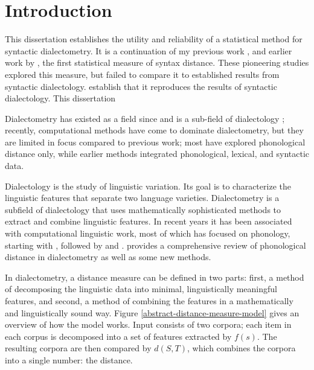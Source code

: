 \chapter{Introduction}

This dissertation establishes the utility and reliability of a
statistical method for syntactic dialectometry. It is a continuation of my previous
work \cite{sanders07}, \cite{sanders08b} and earlier work by
, the first statistical measure of syntax
distance. These pioneering studies explored this measure, but failed
to compare it to established results from syntactic dialectology. establish that it reproduces the results of syntactic dialectology. This
dissertation 

Dialectometry has existed as a field since
 and is a sub-field of dialectology
\cite{chambers98}; recently, computational methods have come to
dominate dialectometry, but they are limited in focus compared to
previous work; most have explored phonological distance only, while
earlier methods integrated phonological, lexical, and syntactic data.

Dialectology is the study of linguistic variation. %
Its goal is to characterize the linguistic features that
separate two language varieties. Dialectometry is a subfield of
dialectology that uses mathematically sophisticated methods to extract
and combine linguistic features. In recent years it has
been associated with computational linguistic work, most of which
has focused on phonology, starting with
, followed by  and
.  provides a comprehensive
review of phonological distance in dialectometry as well as some new
methods.

In dialectometry, a distance measure can be defined in two parts:
first, a method of decomposing the linguistic data into minimal,
linguistically meaningful features, and second, a method of combining
the features in a mathematically and linguistically sound way. Figure
\ref{abstract-distance-measure-model} gives an overview of how the
model works. Input consists of two corpora; each item in each corpus
is decomposed into a set of features extracted by $f(s)$. The
resulting corpora are then compared by $d(S,T)$, which combines the
corpora into a single number: the distance.

